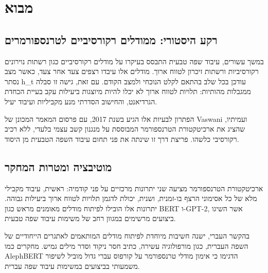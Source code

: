 \hypertarget{ux5deux5d1ux5d5ux5d0}{%
\section{מבוא}\label{ux5deux5d1ux5d5ux5d0}}

\hypertarget{ux5e8ux5e7ux5e2-ux5d4ux5d9ux5e1ux5d8ux5d5ux5e8ux5d9-ux5deux5deux5d5ux5d3ux5dcux5d9ux5dd-ux5e8ux5e7ux5d5ux5e8ux5e1ux5d9ux5d1ux5d9ux5d9ux5dd-ux5dcux5d8ux5e8ux5e0ux5e1ux5e4ux5d5ux5e8ux5deux5e8ux5d9ux5dd}{%
\subsection{רקע היסטורי: ממודלים רקורסיביים
לטרנספורמרים}\label{ux5e8ux5e7ux5e2-ux5d4ux5d9ux5e1ux5d8ux5d5ux5e8ux5d9-ux5deux5deux5d5ux5d3ux5dcux5d9ux5dd-ux5e8ux5e7ux5d5ux5e8ux5e1ux5d9ux5d1ux5d9ux5d9ux5dd-ux5dcux5d8ux5e8ux5e0ux5e1ux5e4ux5d5ux5e8ux5deux5e8ux5d9ux5dd}}

במשך עשורים, עיבוד שפה טבעית התבסס בעיקרו על מודלים רקורסיביים כגון
רשתות נוירונים רקורסיביות ורשתות זיכרון לטווח ארוך. מודלים אלו עיבדו
רצפים צעד אחר צעד, כאשר מצב נסתר h\_t עודכן בכל שלב בהתאם לקלט הנוכחי
ולמצב הקודם. עם זאת, גישה זו סבלה ממגבלות מהותיות: תלויות לטווח ארוך לא
יכלו להיות מיוצגות ביעילות עקב בעיית הכחדת הגרדיאנט, והחישוב הסדרתי מנע
מקביליות ועיבוד יעיל.

הפתרון לבעיות אלו הגיע בשנת 2017, עם פרסום המאמר המכונן של Vaswani
ועמיתיו, שהציג את ארכיטקטורת הטרנספורמר המבוססת על מנגנון קשב עצמי
בלעדי, ללא רכיב רקורסיבי כלשהו. פריצת דרך זו שינתה את פני תחום עיבוד
השפה הטבעית מן היסוד.

\hypertarget{ux5deux5d5ux5d8ux5d9ux5d1ux5e6ux5d9ux5d4-ux5d5ux5deux5d8ux5e8ux5d5ux5ea-ux5d4ux5deux5d7ux5e7ux5e8}{%
\subsection{מוטיבציה ומטרות
המחקר}\label{ux5deux5d5ux5d8ux5d9ux5d1ux5e6ux5d9ux5d4-ux5d5ux5deux5d8ux5e8ux5d5ux5ea-ux5d4ux5deux5d7ux5e7ux5e8}}

ארכיטקטורת הטרנספורמר מציעה שני יתרונות מרכזיים על פני קודמיה: ראשית,
עיבוד מקבילי מלא של כל אסימוני הרצף בו-זמנית, ושנית, יכולת לדגמן תלויות
לטווח ארוך ביעילות גבוהה. יתרונות אלו הובילו לפיתוח מודלים מאומנים מראש
כגון BERT ו-GPT-2, אשר השיגו ביצועים מרשימים במגוון רחב של משימות עיבוד
שפה טבעית.

בהקשר העברי, ישנה חשיבות מיוחדת לפיתוח מודלים המותאמים לאתגרים הייחודיים
של השפה העברית, כגון מורפולוגיה עשירה, כתיב חסר ניקוד וסדר מילים גמיש.
מחקרים כמו AlephBERT הדגימו כי אימון מודלי טרנספורמר על קורפוס עברי גדול
מוביל לשיפור משמעותי בביצועים במשימות עיבוד שפה עברית.

